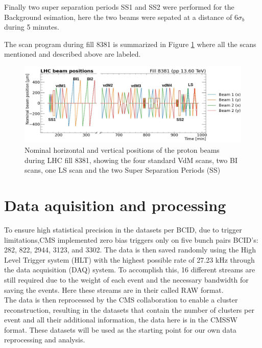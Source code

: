 Finally two super separation periods SS1 and SS2 were performed for the Background esimation, here the two beams were sepated at a distance of $6\sigma_{b}$ during 5 minutes.

The scan program during fill 8381 is summarized in Figure \ref{scan_prog} where all the scans mentioned and described above are labeled.

\begin{center}
  \begin{figure}[h]	
    \centering
    \includegraphics[scale=.35]{Chapter4/2022Scanprorgam.png}
    \caption[2022 scan program]{Nominal horizontal and vertical positions of the proton beams during LHC fill 8381, showing the four standard VdM scans, two BI scans, one LS scan and the two Super Separation Periods (SS)}
    \label{scan_prog}
  \end{figure}
\end{center}

\section{Data aquisition and processing}

To ensure high statistical precision in the datasets per BCID, due to trigger limitations,CMS implemented zero bias triggers only on five bunch pairs BCID's: 282, 822, 2944, 3123, and 3302. The data is then saved randomly using the High Level Trigger system (HLT) with the highest possible rate of 27.23 kHz through the data acquisition (DAQ) system. To accomplish this, 16 different streams are still required due to the weight of each event and the necessary bandwidth for saving the events. Here these streams are in their called RAW format.\\

The data is then reprocessed by the CMS collaboration to enable a cluster reconstruction, resulting in the datasets that contain the number of clusters per event and all their additional information, the data here is in the CMSSW format. These datasets will be used as the starting point for our own data reprocessing and analysis.\\

